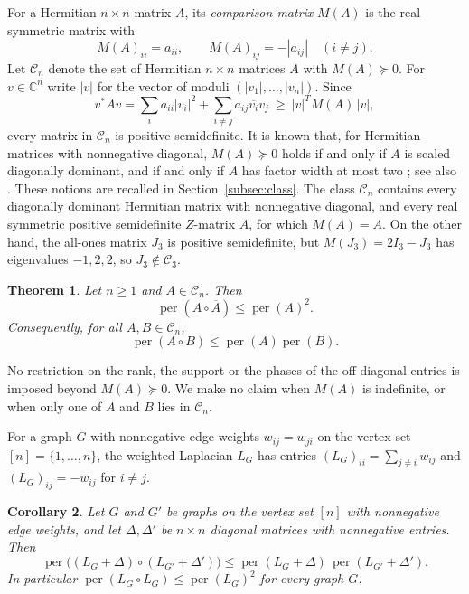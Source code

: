 \documentclass[11pt]{amsart}
\newtheorem{theorem}{Theorem}[section]
\newtheorem{corollary}[theorem]{Corollary}
\theoremstyle{remark}
\numberwithin{equation}{section}
\newcommand{\per}{\operatorname{per}}
\newcommand{\cC}{\mathcal{C}}
\newcommand{\C}{\mathbb{C}}
\newcommand{\conj}[1]{\overline{#1}}
\begin{document}
For a Hermitian $n\times n$ matrix $A$, its \emph{comparison matrix} $M(A)$ is the real symmetric matrix with
\[
M(A)_{ii}=a_{ii},\qquad M(A)_{ij}=-|a_{ij}|\quad(i\ne j).
\]
Let $\cC_n$ denote the set of Hermitian $n\times n$ matrices $A$ with $M(A)\succeq0$. For $v\in\C^n$ write $|v|$ for the vector of moduli $(|v_1|,\dots,|v_n|)$. Since
\[
v^*Av=\sum_i a_{ii}|v_i|^2+\sum_{i\ne j}a_{ij}\conj{v_i}v_j\ \ge\ |v|^{T}M(A)\,|v|,
\]
every matrix in $\cC_n$ is positive semidefinite. It is known that, for Hermitian matrices with nonnegative diagonal, $M(A)\succeq0$ holds if and only if $A$ is scaled diagonally dominant, and if and only if $A$ has factor width at most two \cite[Theorem~3.9]{SN}; see also \cite[Theorem~9]{BCPT}. These notions are recalled in Section~\ref{subsec:class}. The class $\cC_n$ contains every diagonally dominant Hermitian matrix with nonnegative diagonal, and every real symmetric positive semidefinite $Z$-matrix $A$, for which $M(A)=A$. On the other hand, the all-ones matrix $J_3$ is positive semidefinite, but $M(J_3)=2I_3-J_3$ has eigenvalues $-1,2,2$, so $J_3\notin\cC_3$.

\begin{theorem}\label{thm:main}
Let $n\ge1$ and $A\in\cC_n$. Then
\begin{equation}\label{eq:main}
\per(A\circ\conj{A})\le\per(A)^2.
\end{equation}
Consequently, for all $A,B\in\cC_n$,
\begin{equation}\label{eq:main2}
\per(A\circ B)\le\per(A)\per(B).
\end{equation}
\end{theorem}

No restriction on the rank, the support or the phases of the off-diagonal entries is imposed beyond $M(A)\succeq0$. We make no claim when $M(A)$ is indefinite, or when only one of $A$ and $B$ lies in $\cC_n$.

For a graph $G$ with nonnegative edge weights $w_{ij}=w_{ji}$ on the vertex set $[n]=\{1,\dots,n\}$, the weighted Laplacian $L_G$ has entries $(L_G)_{ii}=\sum_{j\ne i}w_{ij}$ and $(L_G)_{ij}=-w_{ij}$ for $i\ne j$.

\begin{corollary}\label{cor:laplacian}
Let $G$ and $G'$ be graphs on the vertex set $[n]$ with nonnegative edge weights, and let $\Delta,\Delta'$ be $n\times n$ diagonal matrices with nonnegative entries. Then
\[
\per\bigl((L_G+\Delta)\circ(L_{G'}+\Delta')\bigr)\le\per(L_G+\Delta)\,\per(L_{G'}+\Delta').
\]
In particular $\per(L_G\circ L_G)\le\per(L_G)^2$ for every graph $G$.
\end{corollary}
\end{document}
